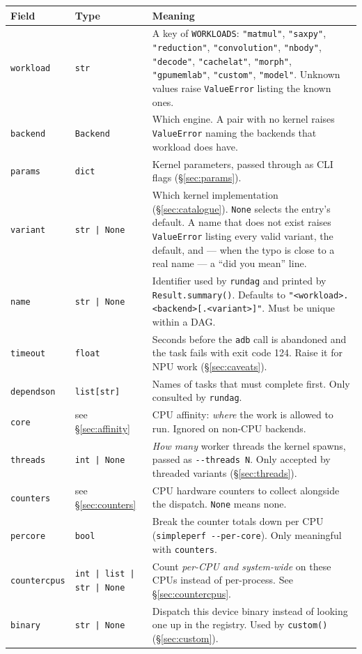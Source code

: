 \documentclass[11pt,a4paper]{article}
\newcommand{\code}[1]{\texttt{\let\_\breakableunderscore #1}}
\newcommand{\breakableunderscore}{\textunderscore\allowbreak}
\begin{document}
\begin{longtable}{@{}p{2.6cm}p{2.5cm}p{9.6cm}@{}}
\toprule
\textbf{Field} & \textbf{Type} & \textbf{Meaning} \\
\midrule
\endhead
\code{workload} & \code{str} & A key of \code{WORKLOADS}: \code{"matmul"},
  \code{"saxpy"}, \code{"reduction"}, \code{"convolution"}, \code{"nbody"},
  \code{"decode"}, \code{"cachelat"}, \code{"morph"}, \code{"gpu\_memlab"}, \code{"custom"}, \code{"model"}. Unknown values raise
  \code{ValueError} listing the known ones. \\
\code{backend} & \code{Backend} & Which engine. A pair with no kernel raises
  \code{ValueError} naming the backends that workload does have. \\
\code{params} & \code{dict} & Kernel parameters, passed through as CLI flags
  (\S\ref{sec:params}). \\
\code{variant} & \code{str | None} & Which kernel implementation
  (\S\ref{sec:catalogue}). \code{None} selects the entry's default. A name that
  does not exist raises \code{ValueError} listing every valid variant, the
  default, and --- when the typo is close to a real name --- a
  ``did you mean'' line. \\
\code{name} & \code{str | None} & Identifier used by \code{run\_dag} and printed
  by \code{Result.summary()}. Defaults to
  \code{"<workload>.<backend>[.<variant>]"}. Must be unique within a DAG. \\
\code{timeout} & \code{float} & Seconds before the \code{adb} call is abandoned
  and the task fails with exit code 124. Raise it for NPU work
  (\S\ref{sec:caveats}). \\
\code{depends\_on} & \code{list[str]} & Names of tasks that must complete first.
  Only consulted by \code{run\_dag}. \\
\code{core} & see \S\ref{sec:affinity} & CPU affinity: \emph{where} the work is
  allowed to run. Ignored on non-CPU backends. \\
\code{threads} & \code{int | None} & \emph{How many} worker threads the kernel
  spawns, passed as \code{-{}-threads N}. Only accepted by threaded variants
  (\S\ref{sec:threads}). \\
\code{counters} & see \S\ref{sec:counters} & CPU hardware counters to collect
  alongside the dispatch. \code{None} means none. \\
\code{per\_core} & \code{bool} & Break the counter totals down per CPU
  (\code{simpleperf -{}-per-core}). Only meaningful with \code{counters}. \\
\code{counter\_cpus} & \code{int | list | str | None} & Count \emph{per-CPU and
  system-wide} on these CPUs instead of per-process. See
  \S\ref{sec:countercpus}. \\
\code{binary} & \code{str | None} & Dispatch this device binary instead of
  looking one up in the registry. Used by \code{custom()}
  (\S\ref{sec:custom}). \\
\bottomrule
\end{longtable}
\end{document}
